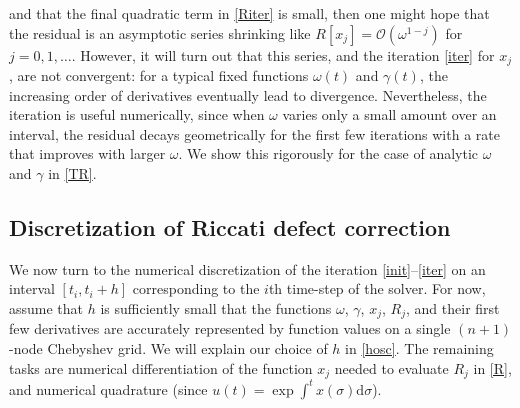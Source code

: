 \documentclass[10pt]{article}
\newcommand{\bigO}{{\mathcal O}}
\newcommand{\om}{\omega}
\newcommand{\g}{\gamma}
\begin{document}
and that the final quadratic term in \cref{Riter} is small,
then one might hope that the
residual is an asymptotic series
shrinking like $R[x_j] = \bigO(\om^{1-j})$ for $j=0,1,\dots$.
However, it will turn out that this series, and the iteration \cref{iter} for $x_j$, are not convergent:
for a typical fixed functions $\om(t)$ and $\g(t)$,
the increasing order of derivatives eventually lead to divergence.
Nevertheless, the iteration
is useful numerically, since when $\om$ varies only a small amount
over an interval,
the residual decays geometrically for the first few iterations with a rate that improves with larger $\om$.
We show this rigorously for the case of analytic $\om$ and $\g$
in \cref{TR}.

\subsection{Discretization of Riccati defect correction}
\label{discr}

We now turn to the numerical discretization of
the iteration \cref{init}--\cref{iter} on an interval
$[t_i,t_i+h]$ corresponding to the $i$th time-step of the solver.
For now, assume that $h$ is sufficiently small that the functions
$\om$, $\g$, $x_j$, $R_j$, and their first few derivatives are accurately
represented by function values on a single $(n+1)$-node Chebyshev grid.
We will explain our choice of $h$ in \cref{hosc}.
The remaining tasks are numerical differentiation of the function
$x_j$ needed to evaluate $R_j$ in \cref{R}, and
numerical quadrature (since $u(t) = \exp \int^t x(\sigma) \mathrm{d}\sigma$).
\end{document}
